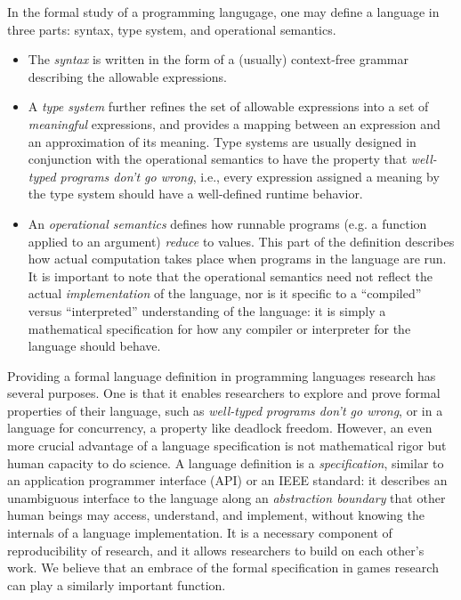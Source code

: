 
  In the formal study of a programming langugage, one may define a language
  in three parts: syntax, type system, and operational semantics.
  \begin{itemize}
    \item The {\em syntax} is written in the form of a (usually)
      context-free grammar describing the allowable expressions.
    \item A {\em type system} further refines the set of allowable
      expressions into a set of {\em meaningful} expressions, and provides
      a mapping between an expression and an approximation of its meaning.
      Type systems are usually designed in conjunction with the operational
      semantics to have the property that {\em well-typed programs don't go
      wrong}, i.e., every expression assigned a meaning by the type system
      should have a well-defined runtime behavior.
    \item An {\em operational semantics} defines how runnable programs
      (e.g. a function applied to an argument) {\em reduce} to values. This
      part of the definition describes how actual computation takes place
      when programs in the language are run. It is important to note that
      the operational semantics need not reflect the actual {\em
      implementation} of the language, nor is it specific to a ``compiled''
      versus ``interpreted'' understanding of the language: it is simply a
      mathematical specification for how any compiler or interpreter for
      the language should behave.
  \end{itemize}
  
  Providing a formal language definition in programming languages research
  has several purposes. One is that it enables researchers to explore
  and prove formal properties of their language, such as {\em well-typed
  programs don't go wrong}, or in a language for concurrency, a property
  like deadlock freedom. However, an even more crucial advantage of a
  language specification is not mathematical rigor but human capacity to do
  science. A language definition is a {\em specification}, similar to an
  application programmer interface (API) or an IEEE standard: it describes
  an unambiguous interface to the language along an {\em abstraction
  boundary} that other human beings may access, understand, and implement,
  without knowing the internals of a language implementation.  It is a
  necessary component of reproducibility of research, and it allows
  researchers to build on each other's work. We believe that an embrace of
  the formal specification in games research can play a similarly important
  function.

